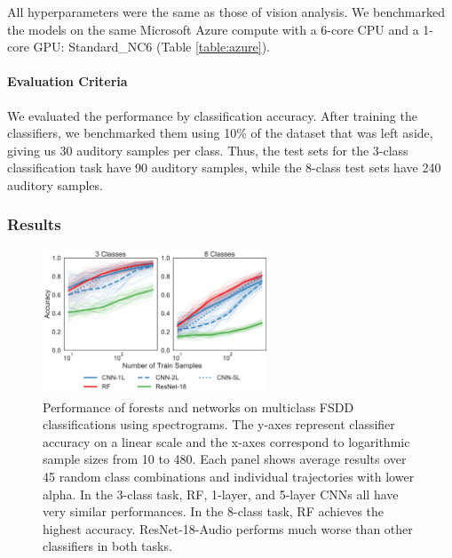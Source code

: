 All hyperparameters were the same as those of vision analysis. We benchmarked the models on the same Microsoft Azure compute with a 6-core CPU and a 1-core GPU: Standard\_NC6 (Table \ref{table:azure}).

\paragraph{Evaluation Criteria}
We evaluated the performance by classification accuracy. After training the classifiers, we benchmarked them using 10\% of the dataset that was left aside, giving us 30 auditory samples per class.
Thus, the test sets for the 3-class classification task have 90 auditory samples, while the 8-class test sets have 240 auditory samples.

\subsubsection{Results}

\begin{figure}[htb]
\centering
\includegraphics[width=0.6\textwidth]{figures/spoken}
  \caption{Performance of forests and networks on multiclass FSDD classifications using spectrograms. 
  The y-axes represent classifier accuracy on a linear scale and the x-axes correspond to logarithmic sample sizes from 10 to 480. Each panel shows average results over 45 random class combinations and individual trajectories with lower alpha.
  In the 3-class task, RF, 1-layer, and 5-layer CNNs all have very similar performances. In the 8-class task, RF achieves the highest accuracy. ResNet-18-Audio performs much worse than other classifiers in both tasks.
  }
\label{fig:spoken_digit}
\end{figure}

